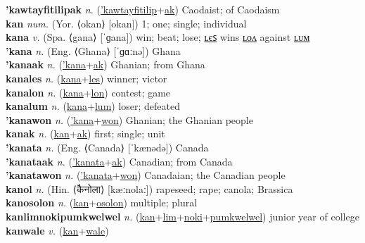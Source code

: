 \textbf{'kawtayfitilipak} \textit{n.} (\hyperref['kawtayfitilip]{'kawtayfitilip}+\hyperref[ak]{ak})
Caodaist; of Caodaism \label{'kawtayfitilipak} \\
\textbf{kan} \textit{num.} (Yor. ⟨okan⟩ [okan])
1; one; single; individual \label{kan} \\
\textbf{kana} \textit{v.} (Spa. ⟨gana⟩ [ˈɡana])
win; beat; lose; \hyperref[kanales]{ʟєꜱ} wins \hyperref[kanalon]{ʟᴏᴧ} against \hyperref[kanalum]{ʟᴜᴍ} \label{kana} \\
\textbf{'kana} \textit{n.} (Eng. ⟨Ghana⟩ [ˈɡɑːnə])
Ghana \label{'kana} \\
\textbf{'kanaak} \textit{n.} (\hyperref['kana]{'kana}+\hyperref[ak]{ak})
Ghanian; from Ghana \label{'kanaak} \\
\textbf{kanales} \textit{n.} (\hyperref[kana]{kana}+\hyperref[les]{les})
winner; victor \label{kanales} \\
\textbf{kanalon} \textit{n.} (\hyperref[kana]{kana}+\hyperref[lon]{lon})
contest; game \label{kanalon} \\
\textbf{kanalum} \textit{n.} (\hyperref[kana]{kana}+\hyperref[lum]{lum})
loser; defeated \label{kanalum} \\
\textbf{'kanawon} \textit{n.} (\hyperref['kana]{'kana}+\hyperref[won]{won})
Ghanian; the Ghanian people \label{'kanawon} \\
\textbf{kanak} \textit{n.} (\hyperref[kan]{kan}+\hyperref[ak]{ak})
first; single; unit \label{kanak} \\
\textbf{'kanata} \textit{n.} (Eng. ⟨Canada⟩ [ˈkænədə])
Canada \label{'kanata} \\
\textbf{'kanataak} \textit{n.} (\hyperref['kanata]{'kanata}+\hyperref[ak]{ak})
Canadian; from Canada \label{'kanataak} \\
\textbf{'kanatawon} \textit{n.} (\hyperref['kanata]{'kanata}+\hyperref[won]{won})
Canadaian; the Canadian people \label{'kanatawon} \\
\textbf{kanol} \textit{n.} (Hin. ⟨कैनोला⟩ [kæːnolaː])
rapeseed; rape; canola; Brassica \label{kanol} \\
\textbf{kanosolon} \textit{n.} (\hyperref[kan]{kan}+\hyperref[osolon]{osolon})
multiple; plural \label{kanosolon} \\
\textbf{kanlimnokipumkwelwel} \textit{n.} (\hyperref[kan]{kan}+\hyperref[lim]{lim}+\hyperref[noki]{noki}+\hyperref[pumkwelwel]{pumkwelwel})
junior year of college \label{kanlimnokipumkwelwel} \\
\textbf{kanwale} \textit{v.} (\hyperref[kan]{kan}+\hyperref[wale]{wale})
